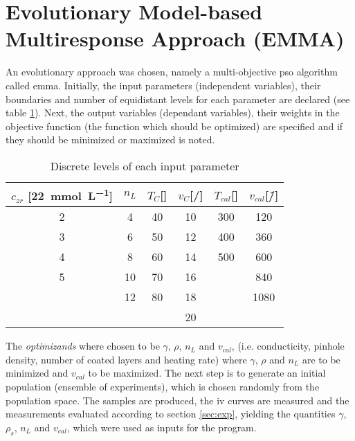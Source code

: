 \section{Evolutionary Model-based Multiresponse Approach (EMMA)}
\label{sec:ss}
An evolutionary approach was chosen, namely a multi-objective 
\gls{pso} algorithm called \gls{emma}\cite{villanova2010function,Kennedy1995,Breiman1997,Carta2011}.
%
%
Initially, the input parameters (independent variables), their boundaries and number of equidistant levels for each parameter are declared (see table \ref{tab:input}).
Next, the output variables (dependant variables), their weights in the objective function (the function which should be optimized) are specified and if they should be minimized or maximized is noted.
%
\begin{table}[htb]
	\centering
	\begin{tabular}{cc cc cc}
		\hline\hline
        $c_{zr}$ [\SI{22}{\milli\mol\per\liter}]	&$n_L$	&$T_{C}$[\oc{}]	&$v_{C}$[\mm{}/\s{}]	&$T_{cal}$[\oc{}]	&$v_{cal}$[\oc{}/\h{}]	\\
		\hline
		2				&4		&40					&10				&300				&120	\\
		3				&6		&50					&12				&400				&360	\\
		4				&8		&60					&14				&500				&600	\\
		5				&10		&70					&16				&					&840	\\
						&12		&80					&18				&					&1080	\\
						&		&					&20				&					&		\\
		\hline\hline
	\end{tabular}
	\caption{Discrete levels of each input parameter }
	\label{tab:input}
\end{table}

The \textit{optimizands} where chosen to be $\gamma$, $\rho$, $n_L$ and $v_{cal}$, 
(i.e. conducticity, pinhole density, number of coated layers and heating rate)
where $\gamma$, $\rho$ and $n_L$ are to be minimized and $v_{cal}$ to be maximized.
The next step is to generate an initial population (ensemble of experiments), which is chosen randomly from the population space. 
The samples are produced, the \gls{iv} curves are measured and the measurements evaluated according to section 
\ref{sec:exp}, yielding the quantities 
$\gamma$, $\rho_s$, $n_L$ and $v_{cal}$, which were used as inputs for the program.

